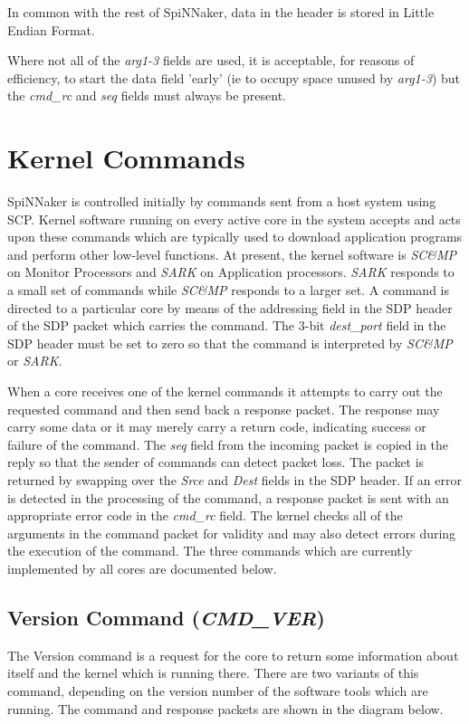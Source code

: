 In common with the rest of SpiNNaker, data in the header is stored in
Little Endian Format.

Where not all of the {\em arg1-3} fields are used, it is acceptable, for
reasons of efficiency, to start the data field 'early' (ie to occupy
space unused by {\em arg1-3}) but the {\em cmd\_rc} and {\em seq}
fields must always be present.

\section{Kernel Commands}

SpiNNaker is controlled initially by commands sent from a host system
using SCP. Kernel software running on every active core in the system
accepts and acts upon these commands which are typically used to
download application programs and perform other low-level
functions. At present, the kernel software is {\em SC\&MP} on Monitor
Processors and {\em SARK} on Application processors. {\em SARK}
responds to a small set of commands while {\em SC\&MP} responds to a
larger set. A command is directed to a particular core by means of the
addressing field in the SDP header of the SDP packet which carries the
command. The 3-bit {\em dest\_port} field in the SDP header must be
set to zero so that the command is interpreted by {\em SC\&MP} or {\em
SARK}.

When a core receives one of the kernel commands it attempts to carry
out the requested command and then send back a response packet. The
response may carry some data or it may merely carry a return code,
indicating success or failure of the command. The {\em seq} field from
the incoming packet is copied in the reply so that the sender of
commands can detect packet loss. The packet is returned by swapping
over the {\em Srce} and {\em Dest} fields in the SDP header. If an
error is detected in the processing of the command, a response packet
is sent with an appropriate error code in the {\em cmd\_rc} field. The
kernel checks all of the arguments in the command packet for validity
and may also detect errors during the execution of the command. The three
commands which are currently implemented by all cores are documented
below.

\subsection{Version Command ({\em CMD\_VER})}

The Version command is a request for the core to return some
information about itself and the kernel which is running there. There
are two variants of this command, depending on the version number of
the software tools which are running.  The command and response
packets are shown in the diagram below.


